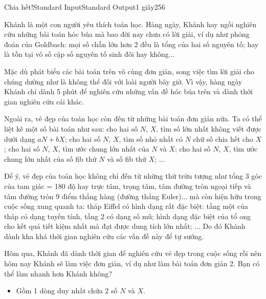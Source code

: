 \documentclass[11pt,a4paper,oneside]{article}
\begin{document}
\begin{problem}{Chia hết!}{Standard Input}{Standard Output}{1 giây}{256}

Khánh là một con người yêu thích toán học. Hàng ngày, Khánh hay ngồi nghiên cứu những bài toán hóc búa
mà bao đời nay chưa có lời giải, ví dụ như phỏng đoán của Goldbach: mọi số chẵn lớn hơn 2 đều là tổng của
hai số nguyên tố; hay là tồn tại vô số cặp số nguyên tố sinh đôi hay không...

Mặc dù phát biểu các bài toán trên vô cùng đơn giản, song việc tìm lời giải cho chúng dường như là không 
thể đối với loài người bây giờ. Vì vậy, hàng ngày Khánh chỉ dành 5 phút để nghiên cứu những vấn đề hóc búa 
trên và dành thời gian nghiên cứu cái khác.

Ngoài ra, vẻ đẹp của toán học còn đến từ những bài toán đơn giản nữa. Ta có thể liệt kê một số bài toán như
sau: cho hai số $N$, $X$, tìm số lớn nhất không viết được dưới dạng $aN + bX$; cho hai số $N$, $X$, tìm số nhỏ nhất có
$N$ chữ số chia hết cho $X$; cho hai số $N$, $X$, tìm ước chung lớn nhất của $N$ và $X$; cho hai số $N$, $X$, tìm ước chung
lớn nhất của số fib thứ $N$ và số fib thứ $X$; ...

Để ý, vẻ đẹp của toán học không chỉ đến từ những thứ trừu tượng như tổng 3 góc của tam giác = 180 độ hay
trực tâm, trọng tâm, tâm đường tròn ngoại tiếp và tâm đường tròn 9 điểm thẳng hàng (đường thẳng Euler)...
mà còn hiện hữu trong cuộc sống xung quanh ta: tháp Eiffel có hình dạng rất đặc biệt: tầng một của tháp có
dạng tuyến tính, tầng 2 có dạng số mũ; hình dạng đặc biệt của tổ ong cho kết quả tiết kiệm nhất mà đạt được
dung tích lớn nhất; ... Do đó Khánh dành kha khá thời gian nghiên cứu các vấn đề này để tự sướng.

Hôm qua, Khánh đã dành thời gian để nghiên cứu vẻ đẹp trong cuộc sống rồi nên hôm nay Khánh sẽ làm việc đơn
giản, ví dụ như làm bài toán đơn giản 2. Bạn có thể làm nhanh hơn Khánh không?

\InputFile

\begin{itemize}
	\item Gồm 1 dòng duy nhất chứa 2 số $N$ và $X$.
\end{itemize}


\end{problem}
\end{document}

